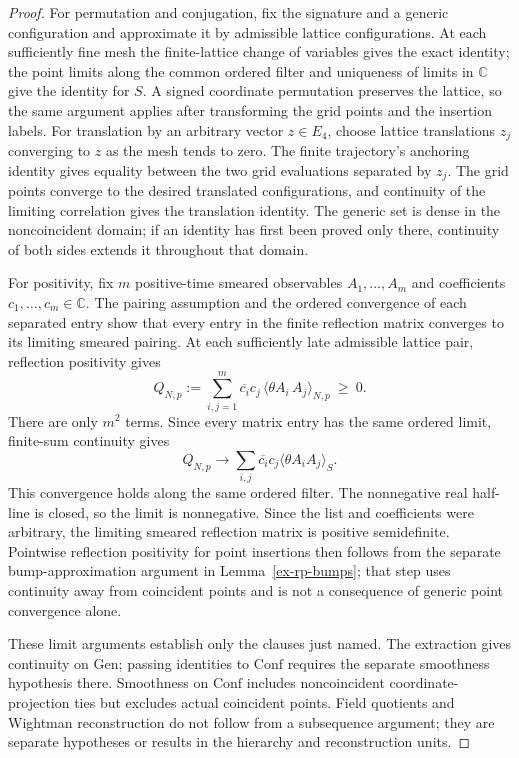 \begin{proof}
For permutation and conjugation, fix the signature and a generic configuration
and approximate it by admissible lattice configurations. At each sufficiently
fine mesh the finite-lattice change of variables gives the exact identity;
the point limits along the common ordered filter and uniqueness of limits in
$\mathbb C$ give the identity for $S$. A signed coordinate permutation
preserves the lattice, so the same argument applies after transforming the
grid points and the insertion labels. For translation by an arbitrary vector
$z\in E_4$, choose lattice translations $z_j$ converging to $z$ as the mesh
tends to zero. The finite trajectory's anchoring identity gives equality
between the two grid evaluations separated by $z_j$. The grid points converge
to the desired translated configurations, and continuity of the limiting
correlation gives the translation identity. The generic set is dense in the
noncoincident domain; if an identity has first been proved only there,
continuity of both sides extends it throughout that domain.

For positivity, fix $m$ positive-time smeared observables $A_1,\ldots,A_m$ and
coefficients $c_1,\ldots,c_m\in\mathbb C$. The pairing assumption and the
ordered convergence of each separated entry show that every entry in the
finite reflection matrix converges to its limiting smeared pairing. At each
sufficiently late admissible lattice pair, reflection positivity gives
\[
  Q_{N,p}:=\sum_{i,j=1}^m \overline{c_i}c_j\,
       \langle \theta A_i\,A_j\rangle_{N,p}\ \geq\ 0.
\]
There are only $m^2$ terms. Since every matrix entry has the same ordered
limit, finite-sum continuity gives
\[ Q_{N,p}\longrightarrow\sum_{i,j}\overline{c_i}c_j\langle\theta A_i A_j\rangle_S. \]
This convergence holds along the same ordered filter.
The nonnegative real half-line is closed, so the limit is nonnegative. Since
the list and coefficients were arbitrary, the limiting smeared reflection
matrix is positive semidefinite. Pointwise reflection positivity
for point insertions then follows from the separate bump-approximation argument
in Lemma~\ref{ex-rp-bumps}; that step uses continuity away from coincident
points and is not a consequence of generic point convergence alone.

These limit arguments establish only the clauses just named. The extraction
gives continuity on $\mathrm{Gen}$; passing identities to $\mathrm{Conf}$
requires the separate smoothness hypothesis there. Smoothness on $\mathrm{Conf}$
includes noncoincident coordinate-projection ties but excludes actual
coincident points. Field quotients and Wightman reconstruction do not follow
from a subsequence argument; they are separate hypotheses or results in the
hierarchy and reconstruction units.
\end{proof}

